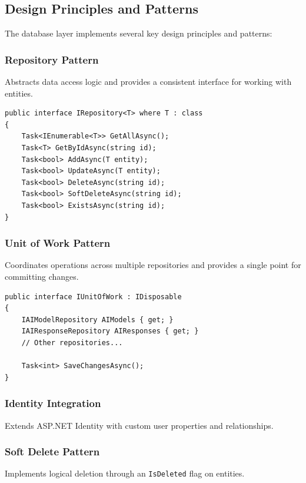 \subsection{Design Principles and Patterns}

The database layer implements several key design principles and patterns:

\subsubsection*{Repository Pattern}

Abstracts data access logic and provides a consistent interface for working with entities.

\begin{verbatim}
public interface IRepository<T> where T : class
{
    Task<IEnumerable<T>> GetAllAsync();
    Task<T> GetByIdAsync(string id);
    Task<bool> AddAsync(T entity);
    Task<bool> UpdateAsync(T entity);
    Task<bool> DeleteAsync(string id);
    Task<bool> SoftDeleteAsync(string id);
    Task<bool> ExistsAsync(string id);
}
\end{verbatim}

\subsubsection*{Unit of Work Pattern}

Coordinates operations across multiple repositories and provides a single point for committing changes.

\begin{verbatim}
public interface IUnitOfWork : IDisposable
{
    IAIModelRepository AIModels { get; }
    IAIResponseRepository AIResponses { get; }
    // Other repositories...
    
    Task<int> SaveChangesAsync();
}
\end{verbatim}

\subsubsection*{Identity Integration}

Extends ASP.NET Identity with custom user properties and relationships.

\subsubsection*{Soft Delete Pattern}

Implements logical deletion through an \texttt{IsDeleted} flag on entities.

